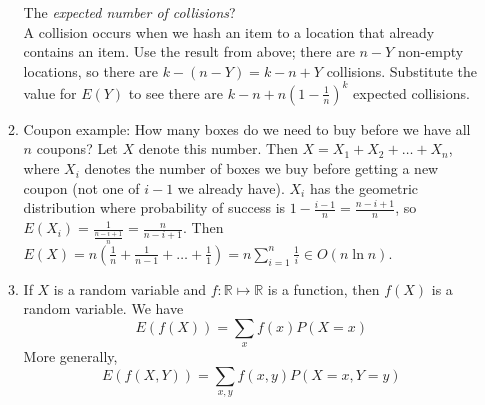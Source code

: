 \documentclass[10pt]{article}
\begin{document}
\begin{multicols}{2}
\begin{enumerate}
\begin{enumerate}
            The \textit{expected number of collisions}?\\ A collision occurs when we hash an item to a location that already contains an item. Use the result from above; there are $n - Y$ non-empty locations, so there are $k - (n - Y) = k-n+Y$ collisions. Substitute the value for $E(Y)$ to see there are $k-n+n \left(1 - \frac{1}{n}\right)^k$ expected collisions.
            \item Coupon example: How many boxes do we need to buy before we have all $n$ coupons? Let $X$ denote this number. Then $X = X_1 + X_2 + \hdots + X_{n}$, where $X_i$ denotes the number of boxes we buy before getting a new coupon (not one of $i-1$ we already have). $X_i$ has the geometric distribution where probability of success is $1 - \frac{i-1}{n} = \frac{n-i+1}{n}$, so $E(X_i) = \frac{1}{\frac{n-i+1}{n}} = \frac{n}{n-i+1}$. Then $E(X)=n \left( \frac{1}{n} + \frac{1}{n-1} + \ldots + \frac{1}{1} \right) = n\sum_{i=1}^{n} \frac{1}{i} \in O(n\ln n)$.
            \item If $X$ is a random variable and $f: \mathbb{R} \mapsto \mathbb{R}$ is a function, then $f(X)$ is a random variable. We have $$E(f(X)) = \sum_x f(x)P(X = x)$$
            More generally, $$E(f(X,Y)) = \sum_{x,y} f(x,y)P(X=x,Y=y)$$
             
        \end{enumerate}
        

\end{enumerate}
\end{multicols}
\end{document}
